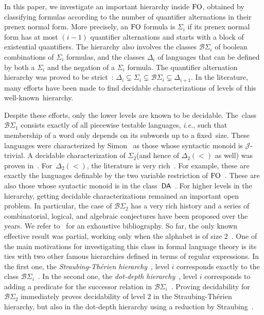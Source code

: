\documentclass[envcountsame]{llncs}
\newcommand{\dec}[1]{\ensuremath{\Delta_{#1}}\xspace}
\newcommand{\bscu}{\ensuremath{\mathcal{B}\Sigma_{1}}\xspace}
\newcommand{\dewd}{\ensuremath{\Delta_{2}(<)}\xspace}
\newcommand{\sicd}{\ensuremath{\Sigma_{2}}\xspace}
\newcommand{\bscd}{\ensuremath{\mathcal{B}\Sigma_{2}}\xspace}
\newcommand{\deci}{\ensuremath{\Delta_{i}}\xspace}
\newcommand{\sici}{\ensuremath{\Sigma_{i}}\xspace}
\newcommand{\bsci}{\ensuremath{\mathcal{B}\Sigma_{i}}\xspace}
\newcommand{\fo}{\ensuremath{\textup{FO}}\xspace}
\begin{document}
In this paper, we investigate an important hierarchy inside \fo, obtained by
classifying formulas according to the number of quantifier alternations in
their prenex normal form. More precisely, an \fo formula is \sici if its
prenex normal form has at most $(i-1)$ quantifier alternations and starts with
a block of existential quantifiers. The hierarchy also involves the classes
\bsci of boolean combinations of \sici formulas, and the classes \deci of
languages that can be defined by both a \sici and the negation of a \sici
formula. The quantifier alternation hierarchy was proved to be
strict~\cite{BroKnaStrict,ThomStrict}: $\deci \subsetneq \sici \subsetneq
{\bsci} \subsetneq \dec{i+1}$. In the
literature, many efforts have been made to find decidable characterizations of levels of
this well-known~hierarchy.

Despite these efforts, only the lower levels are known to be
decidable. The~class \bscu consists exactly of all piecewise testable
languages, \emph{i.e.}, such that membership of a word only depends on its
subwords up to a fixed~size. These languages were characterized by
Simon~\cite{simon75} as those whose syntactic monoid is
$\mathcal{J}$-trivial. A decidable characterization of \sicd (and hence of
\dewd as well) was proven in~\cite{arfi87}.  For~\dewd, the literature is very
rich~\cite{Tesson02diamondsare}. For example, these are exactly the languages
definable by the two variable restriction of \fo~\cite{twfodeux}. These are also those whose syntactic monoid
is in the class~$\textup{\sf DA}$~\cite{pwdelta}. For higher levels in the hierarchy, getting
decidable characterizations remained an important open problem. In particular,
the case of \bscd has a very rich history and a series of combinatorial,
logical, and algebraic conjectures have been proposed over the years.  We refer 
to~\cite{Pin-ThemeVar2011,AK2010,pinbridges,pin-straubing:upper} for an
exhaustive bibliography. So far, the only known effective result was partial,
working only when the alphabet is of size $2$~\cite{StrauDD2}. One of the main
motivations for investigating this class in formal language theory is its ties
with two other famous hierarchies defined in terms of regular expressions. In
the first one, the \emph{Straubing-Th\'erien
  hierarchy}~\cite{StrauConcat,TheConcat}, level $i$ corresponds exactly to
the class \bsci~\cite{Thom82}. In the second one, the \emph{dot-depth
  hierarchy}~\cite{BrzoDot}, level $i$ corresponds to adding a predicate for
the successor relation in \bsci~\cite{Thom82}. Proving decidability for \bscd
immediately proves decidability of level $2$ in the Straubing-Th\'erien
hierarchy, but also in the dot-depth hierarchy using a reduction by
Straubing~\cite{StrauVD}.
\end{document}
